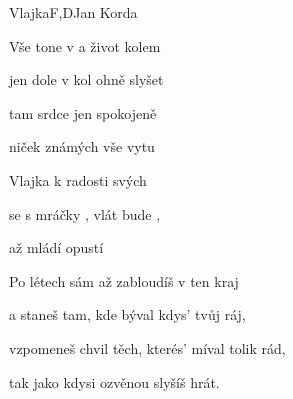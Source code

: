 \begin{song}{Vlajka}{F,D}{Jan Korda}
\begin{SBVerse}
Vše tone v  a život kolem 

jen dole v  kol ohně slyšet 

tam srdce  jen spokojeně 

niček známých vše vytu
\end{SBVerse}
\begin{SBChorus}
Vlajka   k radosti svých 

 se s mráčky , vlát bude , 

až mládí  opustí 
\end{SBChorus}
\begin{SBVerse}
Po létech sám až zabloudíš v ten kraj 

a staneš tam, kde býval kdys' tvůj ráj,

vzpomeneš chvil těch, kterés' míval tolik rád, 

tak jako kdysi ozvěnou slyšíš hrát.
\end{SBVerse}
\end{song}

\pagebreak